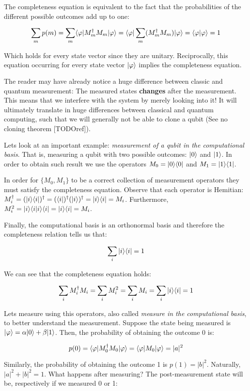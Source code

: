 The completeness equation is equivalent to the fact that the probabilities of the different possible outcomes add up to one:

$$ \sum_m p(m) = \sum_m \langle\varphi|M_m^\dagger M_m|\varphi\rangle = \langle\varphi|\sum_m (M_m^\dagger M_m)|\varphi\rangle = \langle\varphi|\varphi\rangle = 1 $$

Which holds for every state vector since they are unitary. Reciprocally, this equation occurring for every state vector $|\varphi\rangle$ implies the completeness equation.

The reader may have already notice a huge difference between classic and quantum measurement: The measured states \textbf{changes} after the measurement. This means that we interfere with the system by merely looking into it! It will ultimately translate in huge differences between classical and quantum computing, such that we will generally not be able to clone a qubit (See no cloning theorem [TODOref]).

Lets look at an important example: \emph{measurement of a qubit in the computational basis}. That is, measuring a qubit with two possible outcomes: $|0\rangle$ and $|1\rangle$. In order to obtain such result we use the operators $M_0 = |0\rangle \langle 0|$ and $M_1 = |1\rangle \langle 1|$.

In order for $\{M_0, M_1\}$ to be a correct collection of measurement operators they must satisfy the completeness equation. Observe that each operator is Hemitian: $M_i^\dagger = (|i\rangle \langle i|)^\dagger = (\langle i|)^\dagger (|i\rangle)^\dagger = |i\rangle \langle i| = M_i$. Furthermore, $M_i^2 = |i\rangle \langle i|i\rangle \langle i| = |i\rangle \langle i| = M_i$.

Finally, the computational basis is an orthonormal basis and therefore the completeness relation tells us that:

$$ \sum_i |i\rangle\langle i| = 1 $$

We can see that the completeness equation holds:

$$ \sum_i M_i^\dagger M_i = \sum_i M_i^2 = \sum_i M_i = \sum_i |i\rangle\langle i| = 1 $$

Lets measure using this operators, also called \emph{measure in the computational basis}, to better understand the measurement. Suppose the state being measured is $|\varphi\rangle = \alpha|0\rangle + \beta|1\rangle$. Then, the probability of obtaining the outcome 0 is:

$$ p(0) = \langle\varphi|M_0^\dagger M_0|\varphi\rangle = \langle\varphi|M_0|\varphi\rangle = |a|^2 $$

Similarly, the probability of obtaining the outcome 1 is $p(1) = |b|^2$. Naturally, $ |a|^2 + |b|^2 = 1$. What happens after measuring? The post-measurement state will be, respectively if we measured 0 or 1:

